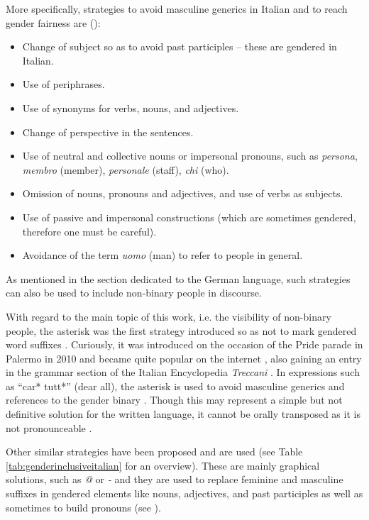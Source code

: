 More specifically, strategies to avoid masculine generics in Italian and to reach gender fairness are (\cite{vitiello2021linguaggio}):
\begin{itemize}
\setlength\itemsep{-0.5em}
    \item Change of subject so as to avoid past participles -- these are gendered in Italian.
    \item Use of periphrases.
    \item Use of synonyms for verbs, nouns, and adjectives.
    \item Change of perspective in the sentences.
    \item Use of neutral and collective nouns or impersonal pronouns, such as \textit{persona}, \textit{membro} (member), \textit{personale} (staff), \textit{chi} (who).
    \item Omission of nouns, pronouns and adjectives, and use of verbs as subjects.
    \item Use of passive and impersonal constructions (which are sometimes gendered, therefore one must be careful).
    \item Avoidance of the term \textit{uomo} (man) to refer to people in general. 
\end{itemize}
As mentioned in the section dedicated to the German language, such strategies can also be used to include non-binary people in discourse. 

With regard to the main topic of this work, i.e. the visibility of non-binary people, the asterisk was the first strategy introduced so as not to mark gendered word suffixes \citep{asterisk}. Curiously, it was introduced on the occasion of the Pride parade in Palermo in 2010 \citep{asterisk} and became quite popular on the internet \citep[50]{marotta2016linguaggio}, also gaining an entry in the grammar section of the Italian Encyclopedia \textit{Treccani} \citep{treccaniasterisco}. In expressions such as ``car* tutt*'' (dear all), the asterisk is used to avoid masculine generics and references to the gender binary \citep{treccaniasterisco}. Though this may represent a simple but not definitive solution for the written language, it cannot be orally transposed as it is not pronounceable \citep[50]{marotta2016linguaggio}. 

Other similar strategies have been proposed and are used (see Table \ref{tab:genderinclusiveitalian} for an overview). These are mainly graphical solutions, such as \textit{@} or \textit{-} and they are used to replace feminine and masculine suffixes in gendered elements like nouns, adjectives, and past participles as well as sometimes to build pronouns (see \cite{vitiello2021linguaggio}). 

